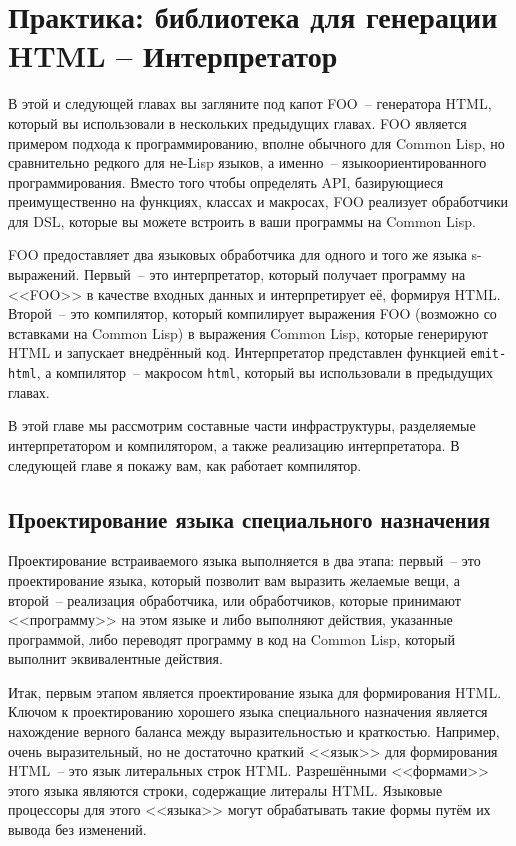 \chapter{Практика: библиотека для генерации HTML -- Интерпретатор}
\label{ch:30}

В этой и следующей главах вы загляните под капот FOO~-- генератора HTML, который вы
использовали в нескольких предыдущих главах. FOO является примером подхода к
программированию, вполне обычного для Common Lisp, но сравнительно редкого для не-Lisp
языков, а именно~-- языкоориентированного программирования. Вместо того чтобы определять
API, базирующиеся преимущественно на функциях, классах и макросах, FOO реализует
обработчики для DSL,
которые вы можете встроить в ваши программы на Common Lisp.

FOO предоставляет два языковых обработчика для одного и того же языка
s-выражений. Первый~-- это интерпретатор, который получает программу на <<FOO>> в качестве
входных данных и интерпретирует её, формируя HTML. Второй~-- это компилятор, который
компилирует выражения FOO (возможно со вставками на Common Lisp) в выражения Common Lisp,
которые генерируют HTML и запускает внедрённый код. Интерпретатор представлен функцией
\lstinline{emit-html}, а компилятор~-- макросом \lstinline{html}, который вы использовали в
предыдущих главах.

В этой главе мы рассмотрим составные части инфраструктуры, разделяемые интерпретатором и
компилятором, а также реализацию интерпретатора. В следующей главе я покажу вам, как
работает компилятор.

\section{Проектирование языка специального назначения}

Проектирование встраиваемого языка выполняется в два этапа: первый~-- это проектирование
языка, который позволит вам выразить желаемые вещи, а второй~-- реализация обработчика,
или обработчиков, которые принимают <<программу>> на этом языке и либо выполняют действия,
указанные программой, либо переводят программу в код на Common Lisp, который выполнит
эквивалентные действия.

Итак, первым этапом является проектирование языка для формирования HTML. Ключом к
проектированию хорошего языка специального назначения является нахождение верного баланса
между выразительностью и краткостью. Например, очень выразительный, но не достаточно
краткий <<язык>> для формирования HTML~-- это язык литеральных строк HTML. Разрешёнными
<<формами>> этого языка являются строки, содержащие литералы HTML.  Языковые процессоры
для этого <<языка>> могут обрабатывать такие формы путём их вывода без изменений.

